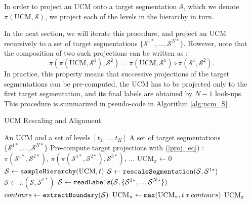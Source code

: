 \documentclass[10pt,journal,cspaper,compsoc]{IEEEtran}
\begin{document}
In order to project an UCM onto a target segmentation $\mathcal{S}$, which we denote $\pi(\textrm{UCM}, \mathcal{S})$, we project each of the levels in the hierarchy in turn.

In the next section, we will iterate this procedure, and project an UCM recursively to a set of target segmentations $\{\mathcal{S}^{1*},...,\mathcal{S}^{N*}\}$. 
However, note that the composition of two such projections can be written as :
\begin{equation}
\pi(\pi(\textrm{UCM}, \mathcal{S}^1), \mathcal{S}^2) = \pi(\textrm{UCM}, \mathcal{S}^1)\circ \pi(\mathcal{S}^1, \mathcal{S}^2).
\end{equation}
In practice, this property means that successive projections of the target segmentations can be pre-computed, the UCM has to be projected only to the first target segmentation, and its final labels are obtained by $N-1$ look-ups. 
This procedure is summarized in pseudo-code in Algorithm \ref{alg:ucm_S}




\begin{algorithm}[h]
\caption{UCM Rescaling and Alignment}
\begin{algorithmic}[1]
\Require An UCM and a set of levels $\left[ t_1,...,t_K \right]$
\Require A set of target segmentations $\{\mathcal{S}^{1*},...,\mathcal{S}^{N*}\}$
\State Pre-compute target projections with (\ref{proj_eq}) :\\  $\pi(\mathcal{S}^{1*}, \mathcal{S}^{2*})$, $\pi(\pi(\mathcal{S}^{1*}, \mathcal{S}^{2*}),\mathcal{S}^{3*})$, ...
\State $\textrm{UCM}_\pi \gets 0$
\State $\mathcal{S} \gets {\tt sampleHierarchy}(\textrm{UCM},t)$
\State $\mathcal{S} \gets {\tt rescaleSegmentation}(\mathcal{S},\mathcal{S}^{1*})$
\State $\mathcal{S} \gets \pi(\mathcal{S},\mathcal{S}^{1*})$
\State $\mathcal{S} \gets {\tt readLabels}(\mathcal{S},\{\mathcal{S}^{1*},...,\mathcal{S}^{N*}\})$
\State $contours \gets {\tt extractBoundary}(\mathcal{S})$  
\State $\textrm{UCM}_\pi \gets {\tt max}(\textrm{UCM}_\pi, t*contours)$ 
\EndFor
\State \Return $\textrm{UCM}_\pi$
\end{algorithmic}
\label{alg:ucm_S}
\end{algorithm}
\end{document}
